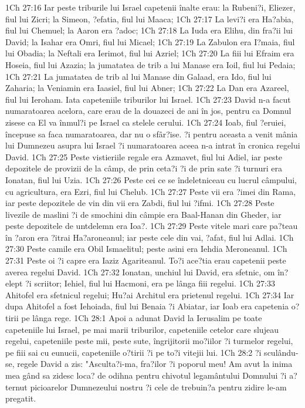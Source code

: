 1Ch 27:16  Iar peste triburile lui Israel capetenii înalte erau: la Rubeni?i, Eliezer, fiul lui Zicri; la Simeon, ?efatia, fiul lui Maaca;
1Ch 27:17  La levi?i era Ha?abia, fiul lui Chemuel; la Aaron era ?adoc;
1Ch 27:18  La Iuda era Elihu, din fra?ii lui David; la Isahar era Omri, fiul lui Micael;
1Ch 27:19  La Zabulon era I?maia, fiul lui Obadia; la Neftali era Ierimot, fiul lui Azriel;
1Ch 27:20  La fiii lui Efraim era Hoseia, fiul lui Azazia; la jumatatea de trib a lui Manase era Ioil, fiul lui Pedaia;
1Ch 27:21  La jumatatea de trib al lui Manase din Galaad, era Ido, fiul lui Zaharia; la Veniamin era Iaasiel, fiul lui Abner;
1Ch 27:22  La Dan era Azareel, fiul lui Ieroham. Iata capeteniile triburilor lui Israel.
1Ch 27:23  David n-a facut numaratoarea acelora, care erau de la douazeci de ani în jos, pentru ca Domnul zisese ca El va înmul?i pe Israel ca stelele cerului.
1Ch 27:24  Ioab, fiul ?eruiei, începuse sa faca numaratoarea, dar nu o sfâr?ise. ?i pentru aceasta a venit mânia lui Dumnezeu asupra lui Israel ?i numaratoarea aceea n-a intrat în cronica regelui David.
1Ch 27:25  Peste vistieriile regale era Azmavet, fiul lui Adiel, iar peste depozitele de provizii de la câmp, de prin ceta?i ?i de prin sate ?i turnuri era Ionatan, fiul lui Uzia.
1Ch 27:26  Peste cei ce se îndeletniceau cu lucrul câmpului, cu agricultura, era Ezri, fiul lui Chelub.
1Ch 27:27  Peste vii era ?imei din Rama, iar peste depozitele de vin din vii era Zabdi, fiul lui ?ifmi.
1Ch 27:28  Peste livezile de maslini ?i de smochini din câmpie era Baal-Hanan din Gheder, iar peste depozitele de untdelemn era Ioa?.
1Ch 27:29  Peste vitele mari care pa?teau în ?aron era ?itrai Ha?aroneanul; iar peste cele din vai, ?afat, fiul lui Adlai.
1Ch 27:30  Peste camile era Obil Ismaelitul; peste asini era Iehdia Meroneanul.
1Ch 27:31  Peste oi ?i capre era Iaziz Agariteanul. To?i ace?tia erau capetenii peste averea regelui David.
1Ch 27:32  Ionatan, unchiul lui David, era sfetnic, om în?elept ?i scriitor; Iehiel, fiul lui Hacmoni, era pe lânga fiii regelui.
1Ch 27:33  Ahitofel era sfetnicul regelui; Hu?ai Architul era prietenul regelui.
1Ch 27:34  Iar dupa Ahitofel a fost Iehoiada, fiul lui Benaia ?i Abiatar, iar Ioab era capetenia o?tirii pe lânga rege.
1Ch 28:1  Apoi a adunat David la Ierusalim pe toate capeteniile lui Israel, pe mai marii triburilor, capeteniile cetelor care slujeau regelui, capeteniile peste mii, peste sute, îngrijitorii mo?iilor ?i turmelor regelui, pe fiii sai cu eunucii, capeteniile o?tirii ?i pe to?i vitejii lui.
1Ch 28:2  ?i sculându-se, regele David a zis: "Asculta?i-ma, fra?ilor ?i poporul meu! Am avut la inima mea gând sa zidesc loca? de odihna pentru chivotul legamântului Domnului ?i a?ternut picioarelor Dumnezeului nostru ?i cele de trebuin?a pentru zidire le-am pregatit.
